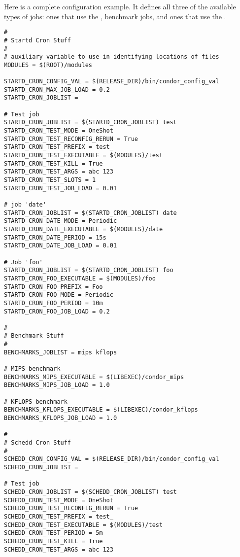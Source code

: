 Here is a complete configuration example.
It defines all three of the available types of jobs:
ones that use the , benchmark jobs,
and ones that use the .
\footnotesize
\begin{verbatim}
#
# Startd Cron Stuff
#
# auxiliary variable to use in identifying locations of files
MODULES = $(ROOT)/modules

STARTD_CRON_CONFIG_VAL = $(RELEASE_DIR)/bin/condor_config_val
STARTD_CRON_MAX_JOB_LOAD = 0.2
STARTD_CRON_JOBLIST =

# Test job
STARTD_CRON_JOBLIST = $(STARTD_CRON_JOBLIST) test
STARTD_CRON_TEST_MODE = OneShot
STARTD_CRON_TEST_RECONFIG_RERUN = True
STARTD_CRON_TEST_PREFIX = test_
STARTD_CRON_TEST_EXECUTABLE = $(MODULES)/test
STARTD_CRON_TEST_KILL = True
STARTD_CRON_TEST_ARGS = abc 123
STARTD_CRON_TEST_SLOTS = 1
STARTD_CRON_TEST_JOB_LOAD = 0.01

# job 'date'
STARTD_CRON_JOBLIST = $(STARTD_CRON_JOBLIST) date
STARTD_CRON_DATE_MODE = Periodic
STARTD_CRON_DATE_EXECUTABLE = $(MODULES)/date
STARTD_CRON_DATE_PERIOD = 15s
STARTD_CRON_DATE_JOB_LOAD = 0.01

# Job 'foo'
STARTD_CRON_JOBLIST = $(STARTD_CRON_JOBLIST) foo
STARTD_CRON_FOO_EXECUTABLE = $(MODULES)/foo
STARTD_CRON_FOO_PREFIX = Foo
STARTD_CRON_FOO_MODE = Periodic
STARTD_CRON_FOO_PERIOD = 10m
STARTD_CRON_FOO_JOB_LOAD = 0.2

#
# Benchmark Stuff
#
BENCHMARKS_JOBLIST = mips kflops

# MIPS benchmark
BENCHMARKS_MIPS_EXECUTABLE = $(LIBEXEC)/condor_mips
BENCHMARKS_MIPS_JOB_LOAD = 1.0

# KFLOPS benchmark
BENCHMARKS_KFLOPS_EXECUTABLE = $(LIBEXEC)/condor_kflops
BENCHMARKS_KFLOPS_JOB_LOAD = 1.0

#
# Schedd Cron Stuff 
#
SCHEDD_CRON_CONFIG_VAL = $(RELEASE_DIR)/bin/condor_config_val
SCHEDD_CRON_JOBLIST =

# Test job
SCHEDD_CRON_JOBLIST = $(SCHEDD_CRON_JOBLIST) test
SCHEDD_CRON_TEST_MODE = OneShot
SCHEDD_CRON_TEST_RECONFIG_RERUN = True
SCHEDD_CRON_TEST_PREFIX = test_
SCHEDD_CRON_TEST_EXECUTABLE = $(MODULES)/test
SCHEDD_CRON_TEST_PERIOD = 5m
SCHEDD_CRON_TEST_KILL = True
SCHEDD_CRON_TEST_ARGS = abc 123

\end{verbatim}
\normalsize


